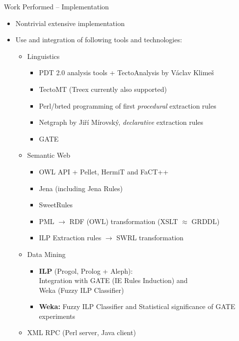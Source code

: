 \documentclass[xcolor=dvipsnames]{beamer}
\begin{document}
\begin{frame}{Work Performed -- Implementation}
\begin{itemize}
	\item Nontrivial extensive implementation	
	\item Use and integration of following tools and technologies:
	\begin{itemize}
		\item Linguistics			
		\begin{itemize}
			\item PDT 2.0 analysis tools + TectoAnalysis by Václav Klimeš
			\item TectoMT (Treex currently also supported)
			\item Perl/brted programming of first \emph{procedural} extraction rules
			\item Netgraph by Jiří Mírovský, \emph{declarative} extraction rules
			\item GATE
		\end{itemize}			
		\item Semantic Web			
		\begin{itemize}
			\item OWL API + Pellet, HermiT and FaCT++
			\item Jena (including Jena Rules)
			\item SweetRules
			\item PML $\rightarrow$ RDF (OWL) transformation (XSLT $\approx$ GRDDL)
			\item ILP Extraction rules $\rightarrow$ SWRL transformation
		\end{itemize}			
		\item Data Mining			
		\begin{itemize}
			\item \textbf{ILP} (Progol, Prolog + Aleph):
				\\Integration with GATE (IE Rules Induction) and 
				\\Weka (Fuzzy ILP Classifier)
			\item \textbf{Weka:}
				Fuzzy ILP Classifier and Statistical significance of GATE experiments
		\end{itemize}			
		\item XML RPC (Perl server, Java client)
	\end{itemize}
\end{itemize}
\end{frame}
\end{document}
